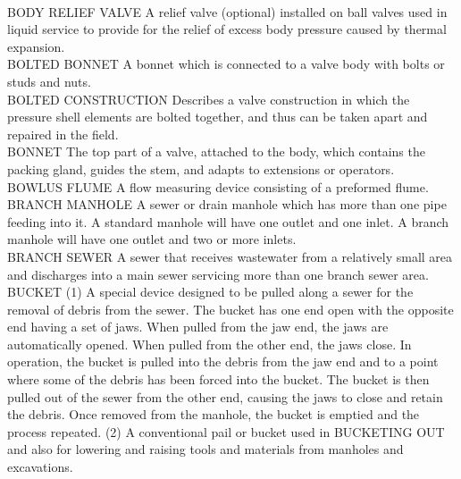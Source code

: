 \vspace{0.3cm}\\
BODY RELIEF VALVE
A relief valve (optional) installed on ball valves used in liquid service to provide for the relief of excess body pressure caused by thermal expansion.
\vspace{0.3cm}\\
BOLTED BONNET
A bonnet which is connected to a valve body with bolts or studs and nuts.
\vspace{0.3cm}\\
BOLTED CONSTRUCTION
Describes a valve construction in which the pressure shell elements are bolted together, and thus can be taken apart and repaired in the field.
\vspace{0.3cm}\\
BONNET
The top part of a valve, attached to the body, which contains the packing gland, guides the stem, and adapts to extensions or operators.
\vspace{0.3cm}\\
BOWLUS FLUME
A flow measuring device consisting of a preformed flume.
\vspace{0.3cm}\\
BRANCH MANHOLE
A sewer or drain manhole which has more than one pipe feeding into it. A standard manhole will have one outlet and one inlet. A branch manhole will have one outlet and two or more inlets. 
\vspace{0.3cm}\\
BRANCH SEWER
A sewer that receives wastewater from a relatively small area and discharges into a main sewer servicing more than one branch sewer area. 
\vspace{0.3cm}\\
BUCKET
(1) A special device designed to be pulled along a sewer for the removal of debris from the sewer. The bucket has one end open with the opposite end having a set of jaws. When pulled from the jaw end, the jaws are automatically opened. When pulled from the other end, the jaws close. In operation, the bucket is pulled into the debris from the jaw end and to a point where some of the debris has been forced into the bucket. The bucket is then pulled out of the sewer from the other end, causing the jaws to close and retain the debris. Once removed from the manhole, the bucket is emptied and the process repeated. (2) A conventional pail or bucket used in BUCKETING OUT and also for lowering and raising tools and materials from manholes and excavations. 
\vspace{0.3cm}\\
